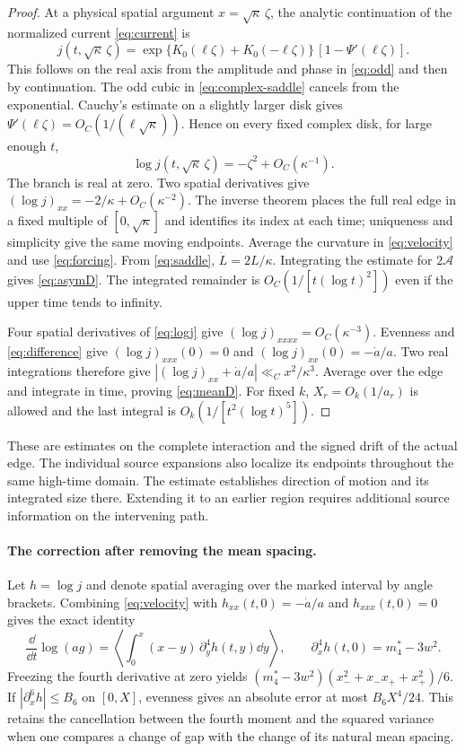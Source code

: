 \begin{proof}
At a physical spatial argument \(x=\sqrt\kappa\,\zeta\), the analytic continuation of the normalized current \eqref{eq:current} is
\[
 j(t,\sqrt\kappa\,\zeta)
 =\exp\{K_0(\ell\zeta)+K_0(-\ell\zeta)\}\,[1-\Psi'(\ell\zeta)].
\]
This follows on the real axis from the amplitude and phase in \eqref{eq:odd} and then by continuation. The odd cubic in \eqref{eq:complex-saddle} cancels from the exponential. Cauchy's estimate on a slightly larger disk gives \(\Psi'(\ell\zeta)=O_C(1/(\ell\sqrt\kappa))\). Hence on every fixed complex disk, for large enough \(t\),
\begin{equation}
 \log j(t,\sqrt\kappa\,\zeta)=-\zeta^2+O_C(\kappa^{-1}).\label{eq:logj}
\end{equation}
The branch is real at zero. Two spatial derivatives give
\((\log j)_{xx}=-2/\kappa+O_C(\kappa^{-2})\). The inverse theorem places the full real edge in a fixed multiple of \([0,\sqrt\kappa]\) and identifies its index at each time; uniqueness and simplicity give the same moving endpoints. Average the curvature in \eqref{eq:velocity} and use \eqref{eq:forcing}. From \eqref{eq:saddle}, \(\dot L=2L/\kappa\). Integrating the estimate for \(2\mathcal A\) gives \eqref{eq:asymD}. The integrated remainder is \(O_C(1/[t(\log t)^2])\) even if the upper time tends to infinity.

Four spatial derivatives of \eqref{eq:logj} give \((\log j)_{xxxx}=O_C(\kappa^{-3})\). Evenness and \eqref{eq:difference} give \((\log j)_{xxx}(0)=0\) and \((\log j)_{xx}(0)=-\dot a/a\). Two real integrations therefore give \(|(\log j)_{xx}+\dot a/a|\ll_C x^2/\kappa^3\). Average over the edge and integrate in time, proving \eqref{eq:meanD}. For fixed \(k\), \(X_r=O_k(1/a_r)\) is allowed and the last integral is \(O_k(1/[t^2(\log t)^5])\).
\end{proof}
These are estimates on the complete interaction and the signed drift of the actual edge. The individual source expansions also localize its endpoints throughout the same high-time domain. The estimate establishes direction of motion and its integrated size there. Extending it to an earlier region requires additional source information on the intervening path.

\paragraph{The correction after removing the mean spacing.}
Let \(h=\log j\) and denote spatial averaging over the marked interval by
angle brackets. Combining \eqref{eq:velocity} with \(h_{xx}(t,0)=-\dot a/a\)
and \(h_{xxx}(t,0)=0\) gives the exact identity
\begin{equation}
 \frac{\dd}{\dd t}\log(ag)=
  \left\langle\int_0^x(x-y)\,\partial_y^4h(t,y)\dd y\right\rangle,
 \qquad \partial_x^4h(t,0)=m_4^*-3w^2 .\label{eq:quartic}
\end{equation}
Freezing the fourth derivative at zero yields
\((m_4^*-3w^2)(x_-^2+x_-x_++x_+^2)/6\).
If \(|\partial_x^6 h|\le B_6\) on \([0,X]\), evenness gives an
absolute error at most \(B_6 X^4/24\). This retains the cancellation between
the fourth moment and the squared variance when one compares a change
of gap with the change of its natural mean spacing.
